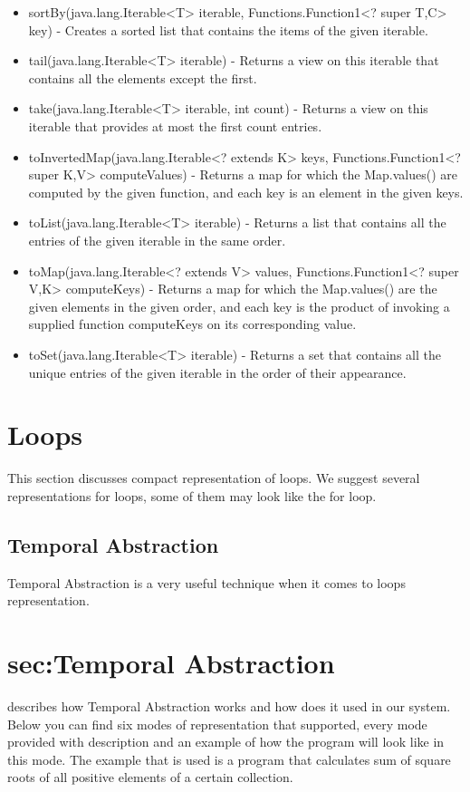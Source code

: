 \begin{itemize}
	\item sortBy(java.lang.Iterable<T> iterable, Functions.Function1<? super T,C> key) - Creates a sorted list that contains the items of the given iterable.
	\item tail(java.lang.Iterable<T> iterable) - Returns a view on this iterable that contains all the elements except the first.
	\item take(java.lang.Iterable<T> iterable, int count) - Returns a view on this iterable that provides at most the first count entries.
	\item toInvertedMap(java.lang.Iterable<? extends K> keys, Functions.Function1<? super K,V> computeValues) - Returns a map for which the Map.values() are computed by the given function, and each key is an element in the given keys.
	\item toList(java.lang.Iterable<T> iterable) - Returns a list that contains all the entries of the given iterable in the same order.
	\item toMap(java.lang.Iterable<? extends V> values, Functions.Function1<? super V,K> computeKeys) - Returns a map for which the Map.values() are the given elements in the given order, and each key is the product of invoking a supplied function computeKeys on its corresponding value.
	\item toSet(java.lang.Iterable<T> iterable) - Returns a set that contains all the unique entries of the given iterable in the order of their appearance.
\end{itemize}
\section{Loops}
This section discusses compact representation of loops. We suggest several representations for loops, some of them may look like the for loop.
\subsection{Temporal Abstraction}
Temporal Abstraction is a very useful technique when it comes to loops representation. \section{sec:Temporal Abstraction} describes how Temporal Abstraction works and how does it used in our system. Below you can find six modes of representation that supported, every mode provided with description and an example of how the program will look like in this mode. The example that is used is a program that calculates sum of square roots of all positive elements of a certain collection.

